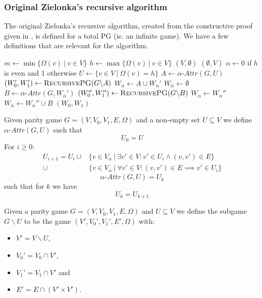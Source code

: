 \subsubsection{Original Zielonka's recursive algorithm}
The original Zielonka's recursive algorithm, created from the constructive proof given in \cite{ZIELONKA1998135}, is defined for a total PG (ie. an infinite game). We have a few definitions that are relevant for the algorithm.
\begin{algorithm}[h]
	\caption{$\textsc{RecursivePG}(\textit{PG } G = (V,V_0,V_1, E, \Omega))$}
	\begin{algorithmic}[1]
		\State $m \gets \min\{ \Omega(v)\ |\ v \in V\}$
		\State $h \gets\max\{ \Omega(v)\ |\ v \in V\}$
		\State \Return $(V,\emptyset)$
		\Else
		\State \Return $(\emptyset, V)$
		\EndIf
		\EndIf
		\State $\alpha \gets 0$ if $h$ is even and $1$ otherwise
		\State $U \gets \{v \in V\ |\ \Omega(v) = h\}$
		\State $A \gets \alpha\textit{-Attr}(G, U)$
		\State $(W_0', W_1') \gets \textsc{RecursivePG}(G \backslash A)$
		\State $W_\alpha \gets A \cup W_\alpha'$
		\State $W_{\overline{\alpha}} \gets \emptyset$
		\Else
		\State $B \gets \overline{\alpha}\textit{-Attr}(G,W_{\overline{\alpha}}')$
		\State $(W_0'', W_1'') \gets \textsc{RecursivePG}(G \backslash B)$
		\State $W_\alpha \gets W_\alpha''$
		\State $W_{\overline{\alpha}} \gets W_{\overline{\alpha}}'' \cup B$
		\EndIf
		\State \Return $(W_0, W_1)$
	\end{algorithmic}
\end{algorithm}

\begin{definition}\cite{ZIELONKA1998135}
	\label{def_attr}Given parity game $G = (V,V_0,V_1,E,\Omega)$ and a non-empty set $U \subseteq V$ we define $\alpha\textit{-Attr}(G,U)$ such that
	\[U_0 = U \]
	For $i \geq 0$:
	\begin{align*}
	U_{i+1} = U_i\cup
	&\{v \in V_\alpha\ |\ \exists v' \in V : v' \in U_i \wedge (v,v') \in E \}\\
	\cup &\{v \in V_{\overline{\alpha}}\ |\ \forall v' \in V :(v,v') \in E \implies v' \in U_i \}
	\end{align*}
	\[\alpha\textit{-Attr}(G,U) = U_k \]
	such that for $k$ we have
	\[U_k = U_{k+1} \]
\end{definition}
\begin{definition}\cite{ZIELONKA1998135}
\label{def_org_subgame}
Given a parity game $G = (V,V_0,V_1, E,\Omega)$ and $U \subseteq V$ we define the subgame $G \backslash U$ to be the game $(V', V_0', V_1', E', \Omega)$ with:
\begin{itemize}
	\item $V' = V \backslash U$,
	\item $V_0' = V_0 \cap V'$,
	\item $V_1' = V_1 \cap V'$ and
	\item $E' = E \cap (V' \times V')$.
\end{itemize}
\end{definition}

